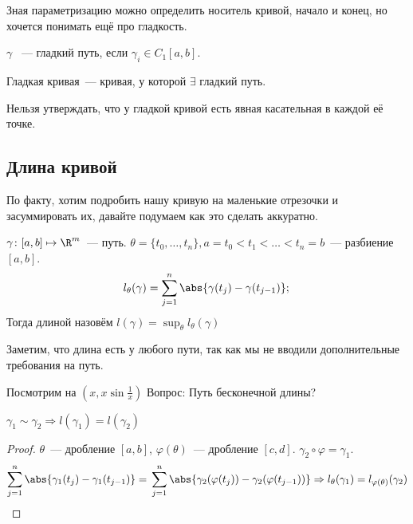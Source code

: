 \begin{remark}
    Зная параметризацию можно определить носитель кривой,
    начало и конец, но хочется понимать ещё про гладкость.
\end{remark}
\begin{definition}
    $\gamma$ ~--- гладкий путь, если $\gamma_i\in C_1[a,b]$.\\
\end{definition}
\begin{definition}
    Гладкая кривая~--- кривая, у которой $\exists$ гладкий путь.
\end{definition}
\begin{remark}
    Нельзя утверждать, что у гладкой кривой есть явная касательная
    в каждой её точке.
\end{remark}
\subsection{Длина кривой}
По факту, хотим подробить нашу кривую на маленькие отрезочки
и засуммировать их, давайте подумаем как это сделать аккуратно.\\
\quad
\begin{definition}
    $\gamma\colon [a, b]\mapsto \R^m$~--- путь.
    $\theta = \{t_0,\dots, t_n\}, a = t_0 < t_1 < \dots < t_n = b$~---
    разбиение $[a, b]$.
    \[
        l_\theta(\gamma) = \sum\limits_{j = 1}^{n} \abs{\gamma(t_j) - \gamma(t_{j - 1})};\\
    \]
    Тогда длиной назовём  $l(\gamma) = \sup_\theta l_\theta(\gamma)$
\end{definition}
\begin{remark}
    Заметим, что длина есть у любого пути, так как мы не вводили
    дополнительные требования на путь.
\end{remark}
\begin{remark}
    Посмотрим на $(x, x\sin \frac{1}{x})$
    Вопрос: Путь бесконечной длины?
\end{remark}
\begin{theorem}
    $\gamma_1 \sim \gamma_2\Rightarrow l(\gamma_1) = l(\gamma_2)$
\end{theorem}
\begin{proof}
    $\theta$~--- дробление $[a,b]$,
    $\varphi(\theta)$~--- дробление $[c,d]$.
    $\gamma_2\circ\varphi=\gamma_1$.
    \[
        \sum\limits_{j = 1}^{n}\abs{\gamma_1(t_j) - \gamma_1(t_{j-1})}=\\
        \sum\limits_{j=1}^{n}\abs{\gamma_2(\varphi(t_j))-\gamma_2(\varphi(t_{j-1}))}
        \Rightarrow
        l_{\theta}(\gamma_1) = l_{\varphi(\theta)}(\gamma_2)
    \]
\end{proof}
